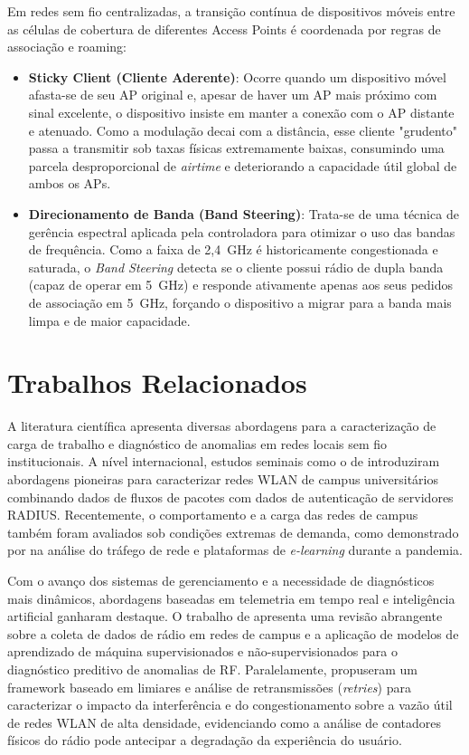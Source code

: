 Em redes sem fio centralizadas, a transição contínua de dispositivos móveis entre as células de cobertura de diferentes Access Points é coordenada por regras de associação e roaming:
\begin{itemize}
    \item \textbf{Sticky Client (Cliente Aderente)}: Ocorre quando um dispositivo móvel afasta-se de seu AP original e, apesar de haver um AP mais próximo com sinal excelente, o dispositivo insiste em manter a conexão com o AP distante e atenuado. Como a modulação decai com a distância, esse cliente "grudento" passa a transmitir sob taxas físicas extremamente baixas, consumindo uma parcela desproporcional de \textit{airtime} e deteriorando a capacidade útil global de ambos os APs.
    
    \item \textbf{Direcionamento de Banda (Band Steering)}: Trata-se de uma técnica de gerência espectral aplicada pela controladora para otimizar o uso das bandas de frequência. Como a faixa de 2,4~GHz é historicamente congestionada e saturada, o \textit{Band Steering} detecta se o cliente possui rádio de dupla banda (capaz de operar em 5~GHz) e responde ativamente apenas aos seus pedidos de associação em 5~GHz, forçando o dispositivo a migrar para a banda mais limpa e de maior capacidade.
\end{itemize}

\section{Trabalhos Relacionados}
\label{sec:fundamentacao_relacionados}

A literatura científica apresenta diversas abordagens para a caracterização de carga de trabalho e diagnóstico de anomalias em redes locais sem fio institucionais. A nível internacional, estudos seminais como o de  introduziram abordagens pioneiras para caracterizar redes WLAN de campus universitários combinando dados de fluxos de pacotes com dados de autenticação de servidores RADIUS. Recentemente, o comportamento e a carga das redes de campus também foram avaliados sob condições extremas de demanda, como demonstrado por  na análise do tráfego de rede e plataformas de \textit{e-learning} durante a pandemia.

Com o avanço dos sistemas de gerenciamento e a necessidade de diagnósticos mais dinâmicos, abordagens baseadas em telemetria em tempo real e inteligência artificial ganharam destaque. O trabalho de  apresenta uma revisão abrangente sobre a coleta de dados de rádio em redes de campus e a aplicação de modelos de aprendizado de máquina supervisionados e não-supervisionados para o diagnóstico preditivo de anomalias de RF. Paralelamente,  propuseram um framework baseado em limiares e análise de retransmissões (\textit{retries}) para caracterizar o impacto da interferência e do congestionamento sobre a vazão útil de redes WLAN de alta densidade, evidenciando como a análise de contadores físicos do rádio pode antecipar a degradação da experiência do usuário.

